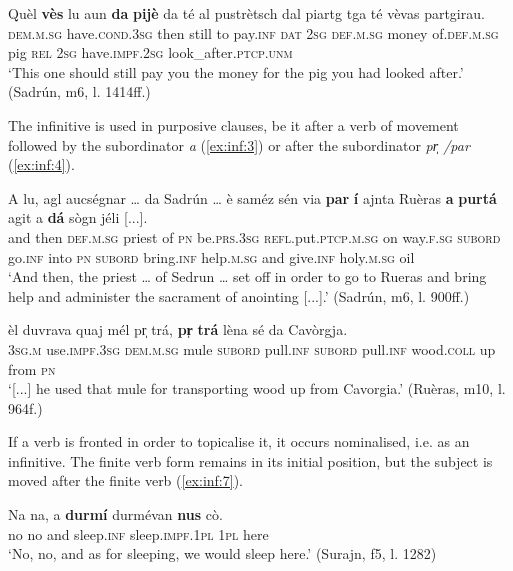 \ea\label{ex:inf:2}
\gll    Quèl \textbf{vès} lu aun \textbf{da} \textbf{pijè} da té al pustrètsch dal piartg tga té vèvas partgirau.\\
\textsc{dem.m.sg} have.\textsc{cond.3sg} then still to pay.\textsc{inf} \textsc{dat} \textsc{2sg} \textsc{def.m.sg} money of.\textsc{def.m.sg} pig \textsc{rel} \textsc{2sg} have.\textsc{impf.2sg} look\_after.\textsc{ptcp.unm}\\
\glt `This one should still pay you the money for the pig you had looked after.' (Sadrún, m6, l. 1414ff.)
\z

The infinitive is used in purposive clauses, be it after a verb of movement followed by the subordinator \textit{a} (\ref{ex:inf:3}) or after the subordinator \textit{ pr̩ /par} (\ref{ex:inf:4}).

\ea\label{ex:inf:3}
\gll    A lu, agl aucségnar … da Sadrún … è saméz sén via \textbf{par} \textbf{í} ajnta Ruèras \textbf{a} \textbf{purtá} agit a \textbf{dá} sògn jéli [...].\\
and then \textsc{def.m.sg} priest {} of \textsc{pn} {} be.\textsc{prs.3sg} \textsc{refl.}put.\textsc{ptcp.m.sg} on way.\textsc{f.sg} \textsc{subord} go.\textsc{inf} into \textsc{pn}  \textsc{subord} bring.\textsc{inf} help.\textsc{m.sg} and give.\textsc{inf} holy.\textsc{m.sg} oil\\
\glt `And then, the priest … of Sedrun … set off in order to go to Rueras and bring help and administer the sacrament of anointing [...].' (Sadrún, m6, l. 900ff.)
\z

\ea\label{ex:inf:4}
\gll [...] èl duvrava quaj mél pr̩ trá, \textbf{pr̩} \textbf{trá} lèna sé da Cavòrgja.\\
{} \textsc{3sg.m} use.\textsc{impf.3sg} \textsc{dem.m.sg} mule \textsc{subord} pull.\textsc{inf} \textsc{subord} pull.\textsc{inf} wood.\textsc{coll} up from \textsc{pn}  \\
\glt `[...] he used that mule for transporting wood up from Cavorgia.' (Ruèras, m10, l. 964f.)
\z

If a verb is fronted in order to topicalise it, it occurs nominalised, i.e. as an infinitive. The finite verb form remains in its initial position, but the subject is moved after the finite verb (\ref{ex:inf:7}).

\ea\label{ex:inf:7}
\gll Na na, a \textbf{durmí} durmévan \textbf{nus} cò. \\
no no and sleep.\textsc{inf} sleep.\textsc{impf.1pl} \textsc{1pl} here\\
\glt `No, no, and as for sleeping, we would sleep here.' (Surajn, f5, l. 1282)
\z

